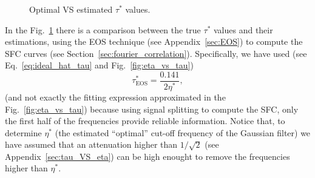 \begin{figure}
  \centering
  \caption{Optimal VS estimated $\tau^*$ values.\label{fig:tau_GF_estimation}}
\end{figure}

In the Fig.~\ref{fig:tau_GF_estimation} there is a comparison between
the true $\tau^*$ values and their estimations, using the \gls{EOS}
technique (see Appendix~\ref{sec:EOS}) to compute the \gls{SFC} curves (see
Section~\ref{sec:fourier_correlation}). Specifically, we have used
(see Eq.~\ref{eq:ideal_hat_tau} and Fig.~\ref{fig:eta_vs_tau})
\begin{equation}
  \tau^*_{\text{EOS}} = \frac{0.141}{2\eta^*},
  \label{eq:tau_VS_eta_empirical_EOS}
\end{equation}
(and not exactly the fitting expression approximated in the
Fig.~\ref{fig:eta_vs_tau}) because using signal splitting to compute
the \gls{SFC}, only the first half of the frequencies provide reliable
information. Notice that, to determine $\eta^*$ (the estimated
``optimal'' cut-off frequency of the Gaussian filter) we have assumed
that an attenuation higher than $1/\sqrt{2}$ (see
Appendix~\ref{sec:tau_VS_eta}) can be high enought to remove the
frequencies higher than $\eta^*$.





